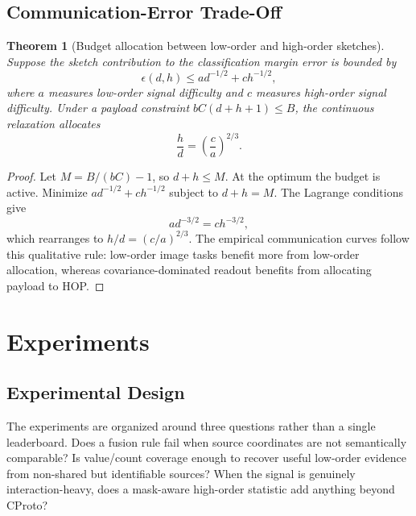 \documentclass[preprint]{elsarticle}
\newtheorem{theorem}{Theorem}
\begin{document}
\subsection{Communication-Error Trade-Off}

\begin{theorem}[Budget allocation between low-order and high-order sketches]
Suppose the sketch contribution to the classification margin error is bounded by
\begin{equation}
    \epsilon(d,h)\le a d^{-1/2}+c h^{-1/2},
\end{equation}
where \(a\) measures low-order signal difficulty and \(c\) measures high-order signal difficulty. Under a payload constraint \(bC(d+h+1)\le B\), the continuous relaxation allocates
\begin{equation}
    \frac{h}{d}=\left(\frac{c}{a}\right)^{2/3}.
\end{equation}
\end{theorem}

\begin{proof}
Let \(M=B/(bC)-1\), so \(d+h\le M\). At the optimum the budget is active. Minimize \(a d^{-1/2}+c h^{-1/2}\) subject to \(d+h=M\). The Lagrange conditions give
\begin{equation}
    a d^{-3/2}=c h^{-3/2},
\end{equation}
which rearranges to \(h/d=(c/a)^{2/3}\). The empirical communication curves follow this qualitative rule: low-order image tasks benefit more from low-order allocation, whereas covariance-dominated readout benefits from allocating payload to HOP.
\end{proof}

\section{Experiments}
\label{sec:experiments}

\subsection{Experimental Design}

The experiments are organized around three questions rather than a single leaderboard. Does a fusion rule fail when source coordinates are not semantically comparable? Is value/count coverage enough to recover useful low-order evidence from non-shared but identifiable sources? When the signal is genuinely interaction-heavy, does a mask-aware high-order statistic add anything beyond CProto?
\end{document}
